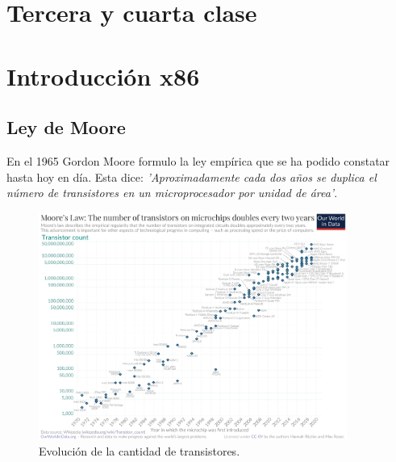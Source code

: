 \documentclass[titlepage,a4paper]{article}
\begin{document}



\newpage

\section*{Tercera y cuarta clase}

\section{Introducción x86}

\subsection*{Ley de Moore}
En el 1965 Gordon Moore formulo la ley empírica que se ha podido constatar hasta hoy en día. Esta dice:
\textit{'Aproximadamente cada dos años se duplica el número de transistores en un microprocesador por unidad de área'}.

\begin{figure}[!htb]
    \centering
    \includegraphics[width=0.9\textwidth]{ImagenesApunte/MooresLaw.png}
    \caption{Evolución de la cantidad de transistores.}
\end{figure}
\end{document}
